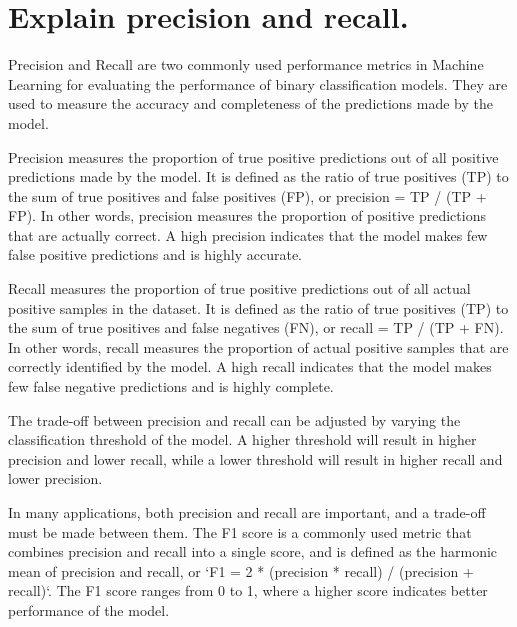 \section{Explain precision and recall.}
Precision and Recall are two commonly used performance metrics in Machine Learning for evaluating the performance of binary classification models. They are used to measure the accuracy and completeness of the predictions made by the model.

Precision measures the proportion of true positive predictions out of all positive predictions made by the model. It is defined as the ratio of true positives (TP) to the sum of true positives and false positives (FP), or precision = TP / (TP + FP). In other words, precision measures the proportion of positive predictions that are actually correct. A high precision indicates that the model makes few false positive predictions and is highly accurate.

Recall measures the proportion of true positive predictions out of all actual positive samples in the dataset. It is defined as the ratio of true positives (TP) to the sum of true positives and false negatives (FN), or recall = TP / (TP + FN). In other words, recall measures the proportion of actual positive samples that are correctly identified by the model. A high recall indicates that the model makes few false negative predictions and is highly complete.

The trade-off between precision and recall can be adjusted by varying the classification threshold of the model. A higher threshold will result in higher precision and lower recall, while a lower threshold will result in higher recall and lower precision.

In many applications, both precision and recall are important, and a trade-off must be made between them. The F1 score is a commonly used metric that combines precision and recall into a single score, and is defined as the harmonic mean of precision and recall, or `F1 = 2 * (precision * recall) / (precision + recall)`. The F1 score ranges from 0 to 1, where a higher score indicates better performance of the model.

